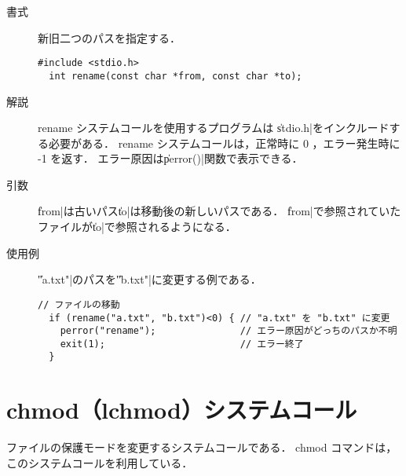 \begin{description}
\item[書式] 新旧二つのパスを指定する．
\begin{lstlisting}[numbers=none]
  #include <stdio.h>
  int rename(const char *from, const char *to);
\end{lstlisting}

\item[解説] rename システムコールを使用するプログラムは
\|stdio.h|をインクルードする必要がある．
rename システムコールは，正常時に 0 ，エラー発生時に -1 を返す．
エラー原因は\|perror()|関数で表示できる．

\item[引数] \|from|は古いパス\|to|は移動後の新しいパスである．
\|from|で参照されていたファイルが\|to|で参照されるようになる．

\item[使用例] \|"a.txt"|のパスを\|"b.txt"|に変更する例である．
\begin{lstlisting}[numbers=none]
  // ファイルの移動
  if (rename("a.txt", "b.txt")<0) { // "a.txt" を "b.txt" に変更
    perror("rename");               // エラー原因がどっちのパスか不明
    exit(1);                        // エラー終了
  }
\end{lstlisting}
\end{description}

\section{chmod（lchmod）システムコール}
ファイルの保護モードを変更するシステムコールである．
chmod コマンドは，このシステムコールを利用している．

